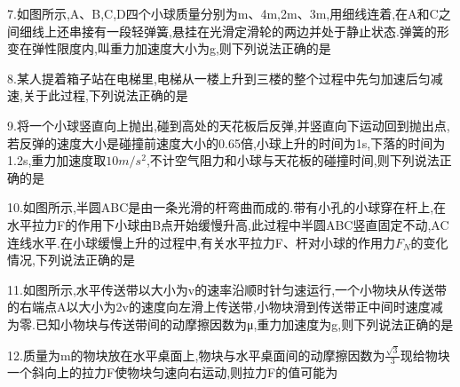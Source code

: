 \question[6] 7.如图所示,A、B,C,D四个小球质量分别为m、4m,2m、3m,用细线连着,在A和C之间细线上还串接有一段轻弹簧,悬挂在光滑定滑轮的两边并处于静止状态.弹簧的形变在弹性限度内,叫重力加速度大小为g,则下列说法正确的是
\begin{solution}{4cm}

\end{solution}



\question[6] 8.某人提着箱子站在电梯里,电梯从一楼上升到三楼的整个过程中先匀加速后匀减速,关于此过程,下列说法正确的是
\begin{solution}{4cm}

\end{solution}



\question[6] 9.将一个小球竖直向上抛出,碰到高处的天花板后反弹,并竖直向下运动回到抛出点,若反弹的速度大小是碰撞前速度大小的0.65倍,小球上升的时间为1s,下落的时间为1.2s,重力加速度取$10m/s^2$,不计空气阻力和小球与天花板的碰撞时间,则下列说法正确的是
\begin{solution}{4cm}

\end{solution}



\question[6] 10.如图所示,半圆ABC是由一条光滑的杆弯曲而成的.带有小孔的小球穿在杆上,在水平拉力F的作用下小球由B点开始缓慢升高,此过程中半圆ABC竖直固定不动,AC连线水平.在小球缓慢上升的过程中,有关水平拉力F、杆对小球的作用力$F_N$的变化情况,下列说法正确的是
\begin{solution}{4cm}

\end{solution}



\question[6] 11.如图所示,水平传送带以大小为v的速率沿顺时针匀速运行,一个小物块从传送带的右端点A以大小为2v的速度向左滑上传送带,小物块滑到传送带正中间时速度减为零.已知小物块与传送带间的动摩擦因数为μ,重力加速度为g,则下列说法正确的是
\begin{solution}{4cm}

\end{solution}



\question[6] 12.质量为m的物块放在水平桌面上,物块与水平桌面间的动摩擦因数为$\frac{\sqrt{3}}{3}$现给物块一个斜向上的拉力F使物块匀速向右运动,则拉力F的值可能为
\begin{solution}{4cm}

\end{solution}



